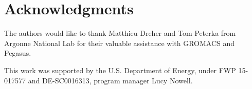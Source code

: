 \section*{Acknowledgments}

The authors would like to thank Matthieu Dreher
and Tom Peterka from Argonne National Lab for their
valuable assistance with GROMACS and Pegasus.

This work was supported by the U.S. Department of
Energy, under FWP 15-017577 and
DE-SC0016313, program manager Lucy Nowell.


% 
